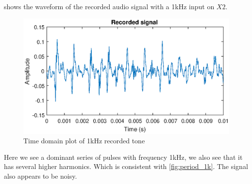  shows the waveform of the recorded audio signal with a 1kHz input on $X2$.

\begin{figure}[H]
    \centering
    \includegraphics[trim={0cm 1.6cm 0cm 2cm},clip,width=\textwidth]{img/Recorded_1khz-09.eps}
    \caption{Time domain plot of 1kHz recorded tone}
    \label{fig:recorded_1k}
\end{figure}

Here we see a dominant series of pulses with frequency 1kHz, we also see that it has several higher harmonics. Which is consistent with \cref{fig:period_1k}. The signal also appears to be noisy.


